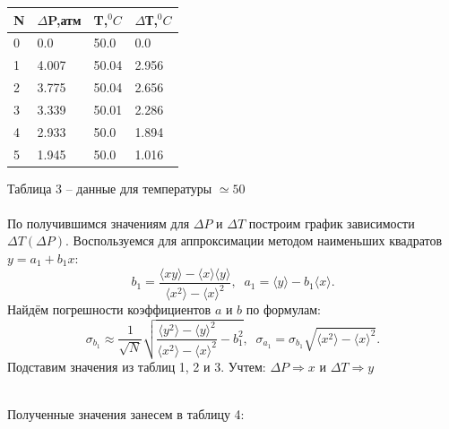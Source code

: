 \documentclass[a4paper,12pt]{article} %
\begin{document}
\begin{center}
\begin{tabular}{ |l||l|l|l| } 

\hline
N & $\Delta$P,атм &T,$^0C$ & $\Delta$Т,$^0C$ \\ \hline
0 & 0.0 & 50.0 & 0.0 \\
1 & 4.007 & 50.04 & 2.956 \\
2 & 3.775 & 50.04 & 2.656 \\
3 & 3.339 & 50.01 & 2.286 \\
4 & 2.933 & 50.0 & 1.894 \\
5 & 1.945 & 50.0 & 1.016 \\
 \hline

\end{tabular}
\end{center}
\begin{center}


Таблица 3 -- данные для температуры $\simeq 50$
\end{center}

\paragraph{}
По получившимся значениям для $\Delta P$ и $\Delta T$ построим график зависимости $\Delta T \left( \Delta P \right)$. 
Воспользуемся для аппроксимации методом наименьших квадратов $ y = a_1 + b_1x $:
\[
b_1 = \frac{\langle xy \rangle - \langle x \rangle \langle y \rangle}{\langle x^2 \rangle - \langle x \rangle ^ 2}, \;\;
a_1 = \langle y \rangle - b_1 \langle x \rangle .
\]
Найдём погрешности коэффициентов $a$ и $b$ по формулам:
\[
\sigma_{b_1} \approx \frac{1}{\sqrt{N}}\sqrt{\frac{\langle y^2 \rangle - \langle y \rangle ^ 2}{\langle x^2 \rangle - \langle x \rangle ^ 2} - b_1^2}, \;\;
\sigma_{a_1}  = \sigma_{b_1} \sqrt{\langle x^2 \rangle - \langle x \rangle ^ 2}.
\]
Подставим значения из таблиц 1, 2 и 3. Учтем: $\Delta P \Rightarrow x$ и $\Delta T \Rightarrow y$ \\ \\

\begin{figure}[h]
\end{figure}
 Полученные значения занесем в таблицу 4:
 
\end{document}
